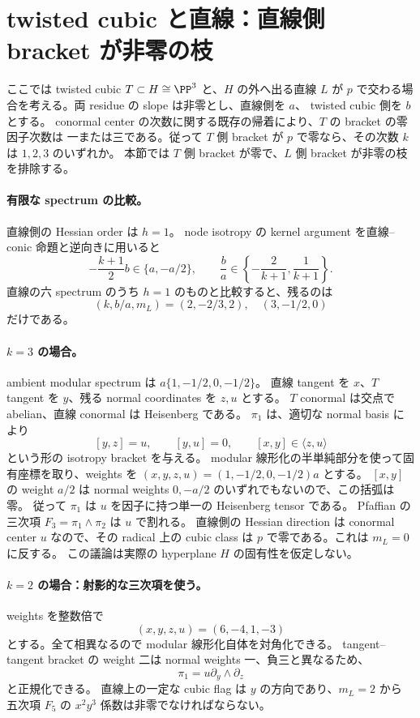 \section{twisted cubic と直線：直線側 bracket が非零の枝}

ここでは twisted cubic $T\subset H\cong\PP^3$ と、$H$ の外へ出る直線 $L$ が
$p$ で交わる場合を考える。両 residue の slope は非零とし、直線側を $a$、
twisted cubic 側を $b$ とする。
conormal center の次数に関する既存の帰着により、$T$ の bracket の零因子次数は
一または三である。従って $T$ 側 bracket が $p$ で零なら、その次数 $k$ は $1,2,3$ のいずれか。
本節では $T$ 側 bracket が零で、$L$ 側 bracket が非零の枝を排除する。

\paragraph{有限な spectrum の比較。}
直線側の Hessian order は $h=1$。
node isotropy の kernel argument を直線--conic 命題と逆向きに用いると
\[
 -\frac{k+1}{2}b\in\{a,-a/2\},
 \qquad \frac ba\in\left\{-\frac2{k+1},\frac1{k+1}\right\}.
\]
直線の六 spectrum のうち $h=1$ のものと比較すると、残るのは
\[
(k,b/a,m_L)=(2,-2/3,2),\quad (3,-1/2,0)
\]
だけである。

\paragraph{$k=3$ の場合。}
ambient modular spectrum は $a\{1,-1/2,0,-1/2\}$。
直線 tangent を $x$、$T$ tangent を $y$、残る normal coordinates を $z,u$ とする。
$T$ conormal は交点で abelian、直線 conormal は Heisenberg である。
$\pi_1$ は、適切な normal basis により
\[
 [y,z]=u,\qquad [y,u]=0,\qquad [x,y]\in\langle z,u\rangle
\]
という形の isotropy bracket を与える。
modular 線形化の半単純部分を使って固有座標を取り、weights を
$(x,y,z,u)=(1,-1/2,0,-1/2)a$ とする。
$[x,y]$ の weight $a/2$ は normal weights $0,-a/2$ のいずれでもないので、この括弧は零。
従って $\pi_1$ は $u$ を因子に持つ単一の Heisenberg tensor である。
Pfaffian の三次項 $F_3=\pi_1\wedge\pi_2$ は $u$ で割れる。
直線側の Hessian direction は conormal center $u$ なので、その radical 上の
cubic class は $p$ で零である。これは $m_L=0$ に反する。
この議論は実際の hyperplane $H$ の固有性を仮定しない。

\paragraph{$k=2$ の場合：射影的な三次項を使う。}
weights を整数倍で
\[
(x,y,z,u)=(6,-4,1,-3)
\]
とする。全て相異なるので modular 線形化自体を対角化できる。
tangent--tangent bracket の weight 二は normal weights 一、負三と異なるため、
\[
\pi_1=u\partial_y\wedge\partial_z
\]
と正規化できる。
直線上の一定な cubic flag は $y$ の方向であり、$m_L=2$ から
五次項 $F_5$ の $x^2y^3$ 係数は非零でなければならない。

